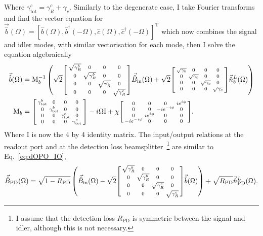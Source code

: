 Where $\gamma^c_\text{tot}=\gamma^c_R+\gamma_c$. Similarly to the degenerate case, I take Fourier transforms and find the vector equation for $\vec{\hat b}(\Omega)=[\hat b(\Omega), \hat b^\dag(-\Omega), \hat c(\Omega), \hat c^\dag(-\Omega)]^\text{T}$ which now combines the signal and idler modes, with similar vectorisation for each mode, then I solve the equation algebraically
\begin{align}\label{eq:nOPO_b_sol}
\vec{\hat b}(\Omega)&=\text{M}_b^{-1}\left(\sqrt{2}\begin{bsmallmatrix}
\sqrt{\gamma^b_R} & 0 & 0 & 0 \\
0 & \sqrt{\gamma^b_R} & 0 & 0 \\
0 & 0 & \sqrt{\gamma^c_R} & 0 \\
0 & 0 & 0 & \sqrt{\gamma^c_R}
\end{bsmallmatrix}\vec{\hat B}_\mathrm{in}(\Omega) + \sqrt{2}\begin{bsmallmatrix}
\sqrt{\gamma_b} & 0 & 0 & 0 \\
0 & \sqrt{\gamma_b} & 0 & 0 \\
0 & 0 & \sqrt{\gamma_c} & 0 \\
0 & 0 & 0 & \sqrt{\gamma_c}
\end{bsmallmatrix}\vec{\hat n}^L_b(\Omega)\right)\\
\text{M}_b&=\begin{bsmallmatrix}
\gamma^b_\mathrm{tot} & 0 & 0 & 0 \\
0 & \gamma^b_\mathrm{tot} & 0 & 0 \\
0 & 0 & \gamma^c_\mathrm{tot} & 0 \\
0 & 0 & 0 & \gamma^c_\mathrm{tot} 
\end{bsmallmatrix}-i\Omega \text{I}+\chi \begin{bsmallmatrix}
0 & 0 & 0 & i e^{i\phi} \\
0 & 0 & -i e^{-i\phi} & 0 \\
0 & i e^{i\phi} & 0 & 0 \\
-i e^{-i\phi} & 0 & 0 & 0
\end{bsmallmatrix}.
\end{align}
Where $\text{I}$ is now the 4 by 4 identity matrix. The input/output relations at the readout port and at the detection loss beamsplitter~\footnote{I assume that the detection loss $R_\text{PD}$ is symmetric between the signal and idler, although this is not necessary.} are similar to Eq.~\ref{eq:dOPO_IO},
\begin{align}
\label{eq:nOPO_IO_relations}
\vec{\hat{B}}_\mathrm{PD}(\Omega)=\sqrt{1-R_\text{PD}}\left(\vec{\hat{B}}_\mathrm{in}(\Omega)-\sqrt{2}\begin{bsmallmatrix}
\sqrt{\gamma^b_R} & 0 & 0 & 0 \\
0 & \sqrt{\gamma^b_R} & 0 & 0 \\
0 & 0 & \sqrt{\gamma^c_R} & 0 \\
0 & 0 & 0 & \sqrt{\gamma^c_R}
\end{bsmallmatrix}\vec{\hat b}(\Omega)\right)+\sqrt{R_\text{PD}}\vec{\hat n}^L_\text{PD}(\Omega).
\end{align}
